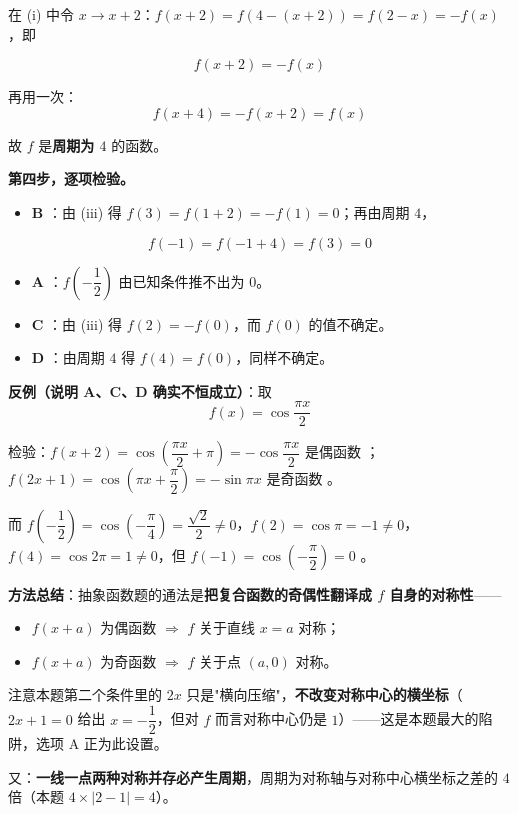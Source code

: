 在 (i) 中令 $x\to x+2$：$f(x+2)=f(4-(x+2))=f(2-x)=-f(x)$，即

\[f(x+2)=-f(x)\tag{iii}\]

再用一次：
\[f(x+4)=-f(x+2)=f(x)\]

故 $f$ 是\textbf{周期为 $4$} 的函数。

\textbf{第四步，逐项检验。}

\begin{itemize}
\item \textbf{B }：由 (iii) 得 $f(3)=f(1+2)=-f(1)=0$；再由周期 $4$，
\end{itemize}
\[f(-1)=f(-1+4)=f(3)=0\]
\begin{itemize}
\item \textbf{A }：$f\left(-\dfrac12\right)$ 由已知条件推不出为 $0$。
\item \textbf{C }：由 (iii) 得 $f(2)=-f(0)$，而 $f(0)$ 的值不确定。
\item \textbf{D }：由周期 $4$ 得 $f(4)=f(0)$，同样不确定。
\end{itemize}

\textbf{反例（说明 A、C、D 确实不恒成立）}：取
\[f(x)=\cos\frac{\pi x}2\]

检验：$f(x+2)=\cos\left(\dfrac{\pi x}2+\pi\right)=-\cos\dfrac{\pi x}2$ 是偶函数 ；$f(2x+1)=\cos\left(\pi x+\dfrac\pi2\right)=-\sin\pi x$ 是奇函数 。

而 $f\left(-\dfrac12\right)=\cos\left(-\dfrac\pi4\right)=\dfrac{\sqrt2}2\ne0$，$f(2)=\cos\pi=-1\ne0$，$f(4)=\cos2\pi=1\ne0$，但 $f(-1)=\cos\left(-\dfrac\pi2\right)=0$ 。


\begin{gktip}
\textbf{方法总结}：抽象函数题的通法是\textbf{把复合函数的奇偶性翻译成 $f$ 自身的对称性}——
\begin{itemize}
\item $f(x+a)$ 为偶函数 $\Longrightarrow$ $f$ 关于直线 $x=a$ 对称；
\item $f(x+a)$ 为奇函数 $\Longrightarrow$ $f$ 关于点 $(a,0)$ 对称。
\end{itemize}

注意本题第二个条件里的 $2x$ 只是"横向压缩"，\textbf{不改变对称中心的横坐标}（$2x+1=0$ 给出 $x=-\dfrac12$，但对 $f$ 而言对称中心仍是 $1$）——这是本题最大的陷阱，选项 A 正为此设置。

又：\textbf{一线一点两种对称并存必产生周期}，周期为对称轴与对称中心横坐标之差的 $4$ 倍（本题 $4\times|2-1|=4$）。
\end{gktip}

